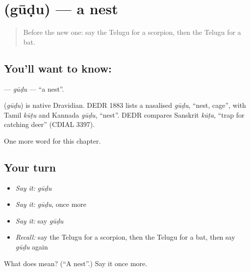 \section[\texorpdfstring{\te{గూడు} (gūḍu)}{గూడు (gūḍu)}]{ (gūḍu) — a nest}

\label{lesson:TE-C228-gudu}



\begin{quote}
Before the new one: say the Telugu for a scorpion, then the Telugu for a bat.
\end{quote}

\subsection*{You'll want to know: }
\textbf{} — \emph{gūḍu} — \textquotedblleft{}a nest\textquotedblright{}.

\begin{cousinweb}
\textbf{} (\emph{gūḍu}) is native Dravidian. DEDR 1883 lists a nasalised \emph{gūḍu}, \textquotedblleft{}nest, cage\textquotedblright{}, with Tamil \emph{kūṭu} and Kannada \emph{gūḍu}, \textquotedblleft{}nest\textquotedblright{}. DEDR compares Sanskrit \emph{kūṭa}, \textquotedblleft{}trap for catching deer\textquotedblright{} (CDIAL 3397).
\end{cousinweb}

\begin{grammarlens}[title={What you've built}]
One more word for this chapter.
\end{grammarlens}

\subsection*{Your turn}
\begin{itemize}
\raggedright
  \item \emph{Say it:} \emph{gūḍu}
  \item \emph{Say it:} \emph{gūḍu}, once more
  \item \emph{Say it:} say \emph{gūḍu}
  \item \emph{Recall:} say the Telugu for a scorpion, then the Telugu for a bat, then say \emph{gūḍu} again
\end{itemize}

\begin{tcolorbox}[breakable,colback=teal!4,colframe=teal!35!black,title={Before you move on}]
What does  mean? (\textquotedblleft{}A nest\textquotedblright{}.) Say it once more.
\end{tcolorbox}
